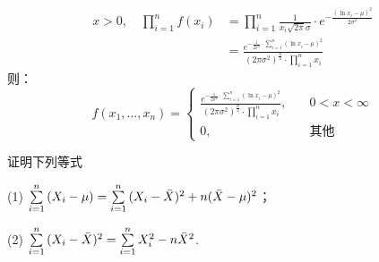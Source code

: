  \xsv
  \[ \begin{split}
    x > 0,\quad
    \prod_{i=1}^{n}{f(x_i)} &= \prod_{i=1}^{n}{\frac{1}{x_i \sqrt{2\pi} \sigma} \cdot e^{-\frac{(\ln{x_i} - \mu)^2}{2 \sigma^2}}}\\
    &= \frac{
      e^{-\frac{1}{2 \sigma^2} \cdot \sum\limits_{i=1}^{n}{(\ln{x_i} - \mu)^2}}
    }{
      (2 \pi \sigma^2)^{\frac{n}{2}} \cdot \prod_{i=1}^{n}{x_i}
    }
  \end{split} \]
  则：
  \[
    f(x_1, ..., x_n) =
    \begin{cases}
      \frac{
	e^{-\frac{1}{2 \sigma^2} \cdot \sum\limits_{i=1}^{n}{(\ln{x_i} - \mu)^2}}
      }{
	(2 \pi \sigma^2)^{\frac{n}{2}} \cdot \prod_{i=1}^{n}{x_i}
      },\quad &0 < x < \infty\\
      0,\quad &\text{其他}
    \end{cases}
  \]
  
   证明下列等式
  
  (1) $\sum\limits_{i=1}^{n}{(X_i - \mu)} = \sum\limits_{i=1}^{n}{(X_i - \bar{X})^2 + n(\bar{X} - \mu)^2}$；
  
  (2) $\sum\limits_{i=1}^{n}{(X_i - \bar{X})^2} = \sum\limits_{i=1}^{n}{X_i^2 - n\bar{X}^2}$.

  \xsv
  


